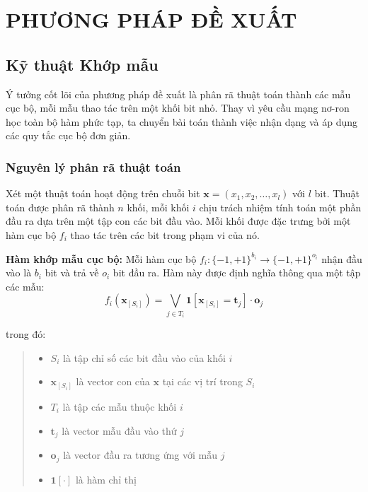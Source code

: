 \chapter{PHƯƠNG PHÁP ĐỀ XUẤT}

\section{Kỹ thuật Khớp mẫu}

Ý tưởng cốt lõi của phương pháp đề xuất là phân rã thuật toán thành các mẫu cục bộ, mỗi mẫu thao tác trên một khối bit nhỏ. Thay vì yêu cầu mạng nơ-ron học toàn bộ hàm phức tạp, ta chuyển bài toán thành việc nhận dạng và áp dụng các quy tắc cục bộ đơn giản.

\subsection{Nguyên lý phân rã thuật toán}

Xét một thuật toán hoạt động trên chuỗi bit $\mathbf{x} = (x_1, x_2, \ldots, x_l)$ với $l$ bit. Thuật toán được phân rã thành $n$ khối, mỗi khối $i$ chịu trách nhiệm tính toán một phần đầu ra dựa trên một tập con các bit đầu vào. Mỗi khối được đặc trưng bởi một hàm cục bộ $f_i$ thao tác trên các bit trong phạm vi của nó.

\vspace{0.2cm}

\textbf{Hàm khớp mẫu cục bộ:} Mỗi hàm cục bộ $f_i: \{-1, +1\}^{b_i} \rightarrow \{-1, +1\}^{o_i}$ nhận đầu vào là $b_i$ bit và trả về $o_i$ bit đầu ra. Hàm này được định nghĩa thông qua một tập các mẫu:
\begin{equation}
    f_i(\mathbf{x}_{[S_i]}) = \bigvee_{j \in T_i} \mathbf{1}[\mathbf{x}_{[S_i]} = \mathbf{t}_j] \cdot \mathbf{o}_j
\end{equation}

trong đó:
\begin{quote}
\begin{itemize}
    \item $S_i$ là tập chỉ số các bit đầu vào của khối $i$
    \item $\mathbf{x}_{[S_i]}$ là vector con của $\mathbf{x}$ tại các vị trí trong $S_i$
    \item $T_i$ là tập các mẫu thuộc khối $i$
    \item $\mathbf{t}_j$ là vector mẫu đầu vào thứ $j$
    \item $\mathbf{o}_j$ là vector đầu ra tương ứng với mẫu $j$
    \item $\mathbf{1}[\cdot]$ là hàm chỉ thị
\end{itemize}
\end{quote}

